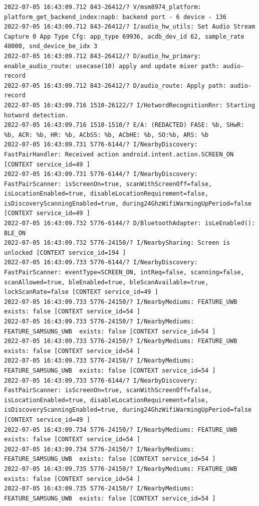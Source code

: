 \documentclass[a4paper,12pt]{book}
\begin{document}
\begin{lstlisting}
2022-07-05 16:43:09.712 843-26412/? V/msm8974_platform: platform_get_backend_index:napb: backend port - 6 device - 136 
2022-07-05 16:43:09.712 843-26412/? I/audio_hw_utils: Set Audio Stream Capture 0 App Type Cfg: app_type 69936, acdb_dev_id 62, sample_rate 48000, snd_device_be_idx 3
2022-07-05 16:43:09.712 843-26412/? D/audio_hw_primary: enable_audio_route: usecase(10) apply and update mixer path: audio-record
2022-07-05 16:43:09.712 843-26412/? D/audio_route: Apply path: audio-record
2022-07-05 16:43:09.716 1510-26122/? I/HotwordRecognitionRnr: Starting hotword detection.
2022-07-05 16:43:09.716 1510-1510/? E/A: (REDACTED) FASE: %b, SHwR: %b, ACR: %b, HR: %b, ACbSS: %b, ACbHE: %b, SO:%b, ARS: %b
2022-07-05 16:43:09.731 5776-6144/? I/NearbyDiscovery: FastPairHandler: Received action android.intent.action.SCREEN_ON [CONTEXT service_id=49 ]
2022-07-05 16:43:09.731 5776-6144/? I/NearbyDiscovery: FastPairScanner: isScreenOn=true, scanWithScreenOff=false, isLocationEnabled=true, disableLocationRequirement=false, isDiscoveryScanningEnabled=true, during24GhzWifiWarmingUpPeriod=false [CONTEXT service_id=49 ]
2022-07-05 16:43:09.732 5776-6144/? D/BluetoothAdapter: isLeEnabled(): BLE_ON
2022-07-05 16:43:09.732 5776-24150/? I/NearbySharing: Screen is unlocked [CONTEXT service_id=194 ]
2022-07-05 16:43:09.733 5776-6144/? I/NearbyDiscovery: FastPairScanner: eventType=SCREEN_ON, intReq=false, scanning=false, scanAllowed=true, bleEnabled=true, bleScanAvailable=true, lockScanRate=false [CONTEXT service_id=49 ]
2022-07-05 16:43:09.733 5776-24150/? I/NearbyMediums: FEATURE_UWB exists: false [CONTEXT service_id=54 ]
2022-07-05 16:43:09.733 5776-24150/? I/NearbyMediums: FEATURE_SAMSUNG_UWB  exists: false [CONTEXT service_id=54 ]
2022-07-05 16:43:09.733 5776-24150/? I/NearbyMediums: FEATURE_UWB exists: false [CONTEXT service_id=54 ]
2022-07-05 16:43:09.733 5776-24150/? I/NearbyMediums: FEATURE_SAMSUNG_UWB  exists: false [CONTEXT service_id=54 ]
2022-07-05 16:43:09.733 5776-6144/? I/NearbyDiscovery: FastPairScanner: isScreenOn=true, scanWithScreenOff=false, isLocationEnabled=true, disableLocationRequirement=false, isDiscoveryScanningEnabled=true, during24GhzWifiWarmingUpPeriod=false [CONTEXT service_id=49 ]
2022-07-05 16:43:09.734 5776-24150/? I/NearbyMediums: FEATURE_UWB exists: false [CONTEXT service_id=54 ]
2022-07-05 16:43:09.734 5776-24150/? I/NearbyMediums: FEATURE_SAMSUNG_UWB  exists: false [CONTEXT service_id=54 ]
2022-07-05 16:43:09.735 5776-24150/? I/NearbyMediums: FEATURE_UWB exists: false [CONTEXT service_id=54 ]
2022-07-05 16:43:09.735 5776-24150/? I/NearbyMediums: FEATURE_SAMSUNG_UWB  exists: false [CONTEXT service_id=54 ]

\end{lstlisting}
\end{document}
